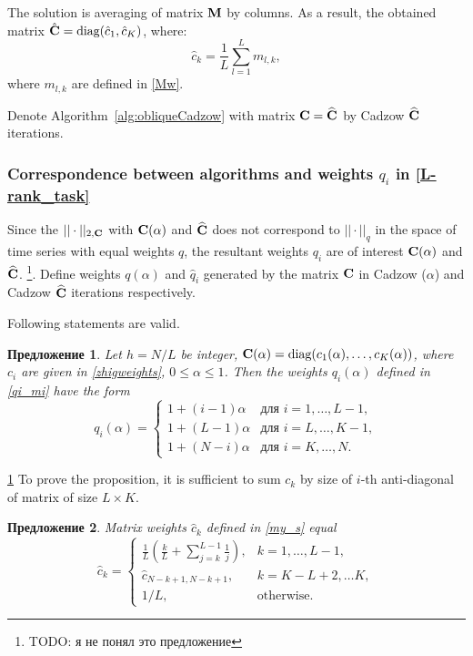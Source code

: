 \documentclass[12pt,a4paper,fleqn,leqno]{article}
\newtheorem{proposition}{Предложение}
\begin{document}
The solution is averaging of matrix $\mathbf{M}$ by columns. As a result, the obtained matrix $\hat {\mathbf{C}} = \text{diag}(\hat c_1, \hat c_K)$, where:
\begin{equation}\label{my_s}
\hat c_k = \frac{1}{L}\sum_{l=1}^L m_{l, k},
\end{equation}
where $m_{l, k}$ are defined in \ref{Mw}.

Denote Algorithm~\ref{alg:obliqueCadzow} with matrix $\mathbf{C}=\widehat{\mathbf{C}}$ by Cadzow $\widehat{\mathbf{C}}$ iterations.

\subsubsection{Correspondence between algorithms and weights $q_i$ in \eqref{L-rank_task}}
Since the $||\cdot||_{2, \mathbf{C}}$ with $\mathbf{C}(\alpha)$ and $\widehat {\mathbf{C}}$ does not correspond to $||\cdot||_q$ in the space of time series with equal weights $q$, the resultant weights $q_i$ are of interest $\mathbf{C}(\alpha)$ and $\widehat {\mathbf{C}}$. \footnote{TODO: я не понял это предложение}.
Define weights $q(\alpha)$ and $\hat q_i$ generated by the matrix $\mathbf{C}$ in Cadzow ($\alpha$) and Cadzow $\widehat{\mathbf{C}}$ iterations respectively.

Following statements are valid.

\begin{proposition}\label{zhigconseq}
Let $h = N/L$ be integer, $\mathbf{C}(\alpha) = \text{diag}(c_1(\alpha), \ldots, c_K(\alpha))$, where $c_i$ are given in \eqref{zhigweights}, $0 \le \alpha \le 1$. Then the weights $q_i(\alpha)$ defined in \eqref{qi_mi} have the form
\begin{equation*}
q_i (\alpha) = \begin{cases}
1 + (i - 1) \alpha & \text{для $i = 1, \ldots, L-1,$}\\
1 + (L - 1) \alpha & \text{для $i = L, \ldots, K-1,$}\\
1 + (N - i) \alpha & \text{для $i = K, \ldots, N.$}
\end{cases}
\end{equation*}
\end{proposition}
\begin{proof5}{\ref{zhigconseq}}
To prove the proposition, it is sufficient to sum $c_k$ by size of $i$-th anti-diagonal of matrix of size $L \times K$.
\end{proof5}


\begin{proposition} \label{myweightstat}
Matrix weights $\hat c_k$ defined in \eqref{my_s} equal
\begin{equation*}
\hat c_k = \begin{cases}
\frac{1}{L}\left(\frac{k}{L} + \sum_{j=k}^{L-1} \frac{1}{j} \right),& k = 1, \ldots, L-1, \\
\hat c_{N - k + 1, N - k + 1}, & k = K - L + 2, \ldots K, \\
1/L, &\text{otherwise}.
\end{cases}
\end{equation*}
\end{proposition}
\end{document}
